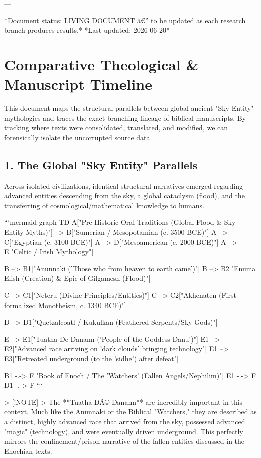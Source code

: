 \documentclass[aps,prd,11pt,onecolumn,superscriptaddress,nofootinbib,floatfix]{revtex4-2}
\begin{document}
---


*Document status: LIVING DOCUMENT â€'' to be updated as each research branch produces results.*
*Last updated: 2026-06-20*
\section{Comparative Theological \& Manuscript Timeline}


This document maps the structural parallels between global ancient "Sky Entity" mythologies and traces the exact branching lineage of biblical manuscripts. By tracking where texts were consolidated, translated, and modified, we can forensically isolate the uncorrupted source data.


\subsection{1. The Global "Sky Entity" Parallels}
Across isolated civilizations, identical structural narratives emerged regarding advanced entities descending from the sky, a global cataclysm (flood), and the transferring of cosmological/mathematical knowledge to humans.


```mermaid
graph TD
A["Pre-Historic Oral Traditions (Global Flood \& Sky Entity Myths)"] --> B["Sumerian / Mesopotamian (c. 3500 BCE)"]
A --> C["Egyptian (c. 3100 BCE)"]
A --> D["Mesoamerican (c. 2000 BCE)"]
A --> E["Celtic / Irish Mythology"]


B --> B1["Anunnaki ('Those who from heaven to earth came')"]
B --> B2["Enuma Elish (Creation) \& Epic of Gilgamesh (Flood)"]


C --> C1["Neteru (Divine Principles/Entities)"]
C --> C2["Akhenaten (First formalized Monotheism, c. 1340 BCE)"]


D --> D1["Quetzalcoatl / Kukulkan (Feathered Serpents/Sky Gods)"]


E --> E1["Tuatha De Danann ('People of the Goddess Danu')"]
E1 --> E2["Advanced race arriving on 'dark clouds' bringing technology"]
E1 --> E3["Retreated underground (to the 'sidhe') after defeat"]


B1 -.-> F["Book of Enoch / The 'Watchers' (Fallen Angels/Nephilim)"]
E1 -.-> F
D1 -.-> F
```


> [!NOTE]
> The **Tuatha DÃ© Danann** are incredibly important in this context. Much like the Anunnaki or the Biblical "Watchers," they are described as a distinct, highly advanced race that arrived from the sky, possessed advanced "magic" (technology), and were eventually driven underground. This perfectly mirrors the confinement/prison narrative of the fallen entities discussed in the Enochian texts.
\end{document}
